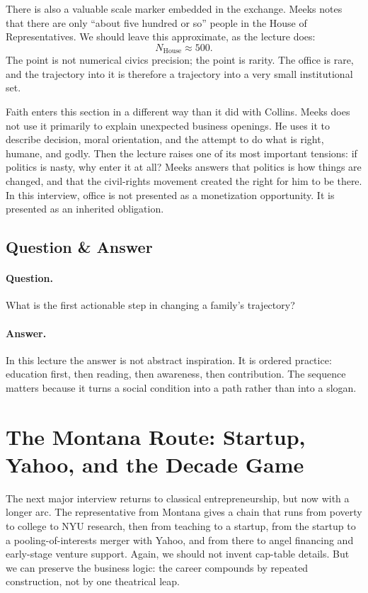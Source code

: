 There is also a valuable scale marker embedded in the exchange. Meeks notes that there are only ``about five hundred or so'' people in the House of Representatives. We should leave this approximate, as the lecture does:
\begin{equation}
N_{\text{House}} \approx 500.
\end{equation}
The point is not numerical civics precision; the point is rarity. The office is rare, and the trajectory into it is therefore a trajectory into a very small institutional set.

Faith enters this section in a different way than it did with Collins. Meeks does not use it primarily to explain unexpected business openings. He uses it to describe decision, moral orientation, and the attempt to do what is right, humane, and godly. Then the lecture raises one of its most important tensions: if politics is nasty, why enter it at all? Meeks answers that politics is how things are changed, and that the civil-rights movement created the right for him to be there. In this interview, office is not presented as a monetization opportunity. It is presented as an inherited obligation.

\subsection{Question \& Answer}

\paragraph{Question.} What is the first actionable step in changing a family's trajectory?

\paragraph{Answer.} In this lecture the answer is not abstract inspiration. It is ordered practice: education first, then reading, then awareness, then contribution. The sequence matters because it turns a social condition into a path rather than into a slogan.

\section{The Montana Route: Startup, Yahoo, and the Decade Game}

The next major interview returns to classical entrepreneurship, but now with a longer arc. The representative from Montana gives a chain that runs from poverty to college to NYU research, then from teaching to a startup, from the startup to a pooling-of-interests merger with Yahoo, and from there to angel financing and early-stage venture support. Again, we should not invent cap-table details. But we can preserve the business logic: the career compounds by repeated construction, not by one theatrical leap.

